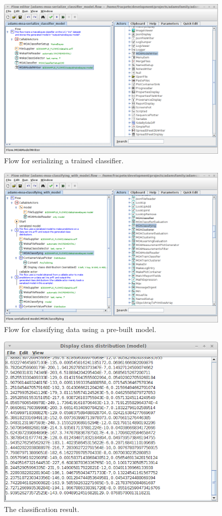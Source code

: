 \documentclass[a4paper]{book}
\begin{document}
\begin{figure}[htb]
  \centering
  \includegraphics[width=12.0cm]{images/moa-serialize-classifier.png}
  \caption{Flow for serializing a trained classifier.}
  \label{moa-serialize-classifier}
\end{figure}

\begin{figure}[htb]
  \centering
  \includegraphics[width=12.0cm]{images/moa-classifying-flow.png}
  \caption{Flow for classifying data using a pre-built model.}
  \label{moa-classifying-flow}
\end{figure}

\begin{figure}[htb]
  \centering
  \includegraphics[width=12.0cm]{images/moa-classifying-output.png}
  \caption{The classification result.}
  \label{moa-classifying-output}
\end{figure}
\end{document}

